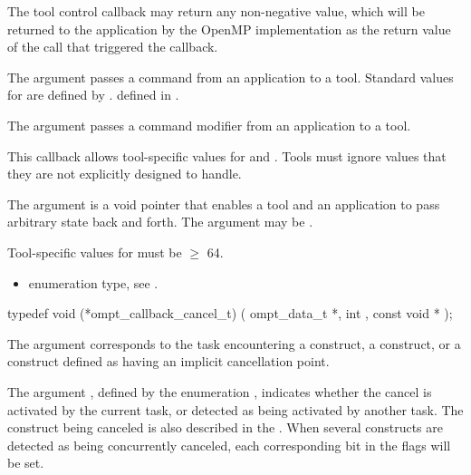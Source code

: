\descr

The tool control callback may return any non-negative value, which will be returned to the
application by the OpenMP implementation as the return value of the
 call that triggered the callback.

\argdesc

The argument  passes a command from an application
to a tool.  Standard values for  are defined by
.  defined in .

The argument  passes a command modifier from an
application to a tool.

This callback allows tool-specific values for  and
.  Tools must ignore  values that they are
not explicitly designed to handle.

The argument  is a void pointer that enables a tool and
an application to pass arbitrary state back and forth.
The argument  may be .

\codeptrdesc


\constraints
Tool-specific values for  must be $\geq$ 64.

\crossreferences
\begin{itemize}
\item {} enumeration type, see .
\end{itemize}

\label{sec:ompt_callback_cancel_t}
\format

\begin{ccppspecific}
\begin{omptCallback}
typedef void (*ompt_callback_cancel_t) (
  ompt_data_t *,
  int ,
  const void *
);
\end{omptCallback}
\end{ccppspecific}


\argdesc

The argument  corresponds to the task
encountering a  construct, a 
construct, or a construct defined as having an implicit cancellation
point.

The argument , defined by the enumeration
, indicates whether the cancel is
activated by the current task, or detected as being activated by
another task.  The construct being canceled is also described in the
. When several constructs are detected as being
concurrently canceled, each corresponding bit in the flags will be
set.

